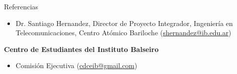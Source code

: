 \documentclass{resume} %
\begin{document}
\begin{rSection}{Referencias}
\begin{enumerate}[label={[\arabic*]}]
\begin{itemize}
                  \item Dr. Santiago Hernandez, Director de Proyecto Integrador,  Ingeniería en Telecomunicaciones,  Centro  Atómico Bariloche (\href{mailto:shernandez@ib.edu.ar}{shernandez@ib.edu.ar})
              \end{itemize}
        \item \label{ceib} \textbf{Centro de Estudiantes del Instituto Balseiro}
              \begin{itemize}
                  \item Comisión Ejecutiva (\href{mailto:cdceib@gmail.com}{cdceib@gmail.com})
              \end{itemize}
    \end{enumerate}

\end{rSection}

\end{document}

